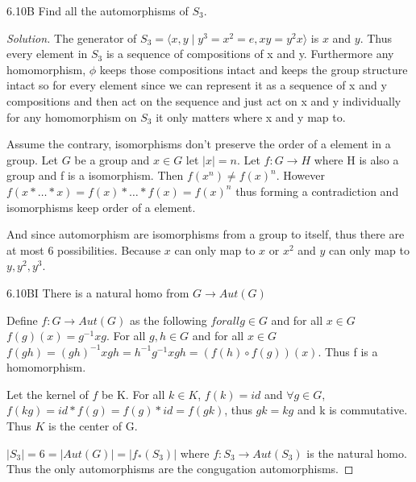 \documentclass{article}
\newcommand{\abs}[1]{\lvert #1\rvert}
\newenvironment{solution}
{\renewcommand\qedsymbol{$\blacksquare$}\begin{proof}[Solution]}
{\end{proof}}
\begin{document}
\begin{PROB}{6.10B}\label{Problem 6.10B.}
    Find all the automorphisms of $S_3$.
\end{PROB}
\begin{solution}
    The generator of $S_3 = \langle x, y \mid y^3 = x^2 = e, xy = y^2x\rangle$ is $x$ and $y$. Thus every element in $S_3$ is a sequence of compositions of x and y. Furthermore any homomorphism, $\phi$ keeps those compositions intact and keeps the group structure intact so for every element since we can represent it as a sequence of x and y compositions and then act on the sequence and just act on x and y individually for any homomorphism on $S_3$ it only matters where x and y map to. 

    Assume the contrary, isomorphisms don't preserve the order of a element in a group. Let $G$ be a group and $x \in G$ let $\abs{x} = n$. Let $f: G \to H$ where H is also a group and f is a isomorphism. Then $f(x^n) \neq f(x)^n$. However $f(x \ast \ldots \ast x) = f(x) \ast \ldots \ast f(x) = f(x)^n$ thus forming a contradiction and isomorphisms keep order of a element.

    And since automorphism are isomorphisms from a group to itself, thus there are at most 6 possibilities. Because $x$ can only map to $x$ or $x^2$ and $y$ can only map to $y, y^2, y^3$.

    \begin{claim}{6.10BI}
        There is a natural homo from $G \to Aut(G)$
    \end{claim}

    Define $f: G \to Aut(G)$ as the following $for all g \in G$ and for all $x \in G$ $f(g)(x) = g^{-1}xg$. For all $g, h \in G$ and for all $x \in G$ $f(gh) =(gh)^{-1}xgh = h^{-1}g^{-1}xgh = (f(h) \circ f(g))(x)$. Thus f is a homomorphism.

    Let the kernel of $f$ be K. For all $k \in K$, $f(k) =id$ and $\forall g \in G$, $f(kg) = id * f(g) = f(g) * id = f(gk)$, thus $gk = kg$ and k is commutative. Thus $K$ is the center of G.


    $\abs{S_3} = 6 = \abs{Aut(G)} = \abs{f_*(S_3)}$ where $f: S_3 \to Aut(S_3)$ is the natural homo. Thus the only automorphisms are the congugation automorphisms.
\end{solution}
\end{document}
